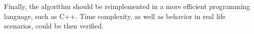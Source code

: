 Finally, the algorithm should be reimplemented in a more efficient programming language, such as C++. Time complexity, as well as behavior in real life scenarios, could be then verified.








